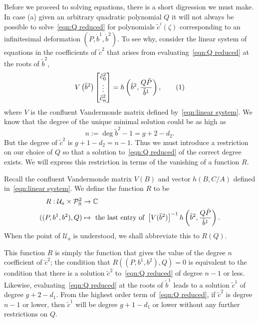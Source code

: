 \documentclass{article}
\begin{document}
Before we proceed to solving equations, there is a short digression we must make. In case (a) given an arbitrary quadratic polynomial $Q$ it will not always be possible to solve~\eqref{eqn:Q reduced} for polynomials $\tilde{c}^i(\zeta)$ corresponding to an infinitesimal deformation $(\dot{P},\dot{b}^1,\dot{b}^2)$. To see why, consider the linear system of equations in the coefficients of $\tilde{c}^2$ that arises from evaluating~\eqref{eqn:Q reduced} at the roots of $\tilde{b}^2$,
\[
V\left(\tilde{b}^2\right)
\begin{bmatrix}
\tilde{c}^2_0 \\ \vdots \\ \tilde{c}^2_n
\end{bmatrix}
=
h\bra{\tilde{b}^2, \frac{Q\tilde{P}}{\tilde{b}^1} },
\labelthis{eqn:Q reduced linear}
\]
where $V$ is the confluent Vandermonde matrix defined by~\eqref{eqn:linear system}. 
We know that the degree of the unique minimal solution could be as high as
\[
n := \deg \tilde{b}^2 - 1 = g + 2 - d_2.
\]
But 
the degree of $\tilde{c}^2$ is $g + 1 - d_2 = n-1$. 
Thus we must introduce a restriction on our choice of $Q$ so that a solution to~\eqref{eqn:Q reduced} of the correct degree exists. We will express this restriction in terms of the vanishing of a function $R$.

\begin{defn}\label{def:def R}
Recall the confluent Vandermonde matrix $V(B)$ and vector $h(B,C/A)$ defined in~\eqref{eqn:linear system}. We define the function $R$ to be
\begin{align*}
R : \mathcal{U}_{a} \times \mathcal{P}^2_{\mathbb{R}} &\to \mathbb{C} \\
((P,b^1,b^2), Q) &\mapsto \text{ the last entry of } \left[V( \tilde{b}^2 )\right]^{-1}
h\left(\tilde{b}^2, \frac{Q\tilde{P}}{\tilde{b}^1} \right).
\end{align*}
When the point of $\mathcal{U}_{a}$ is understood, we shall abbreviate this to $R(Q)$.
\end{defn}

This function $R$ is simply the function that gives the value of the degree $n$ coefficient of $\tilde{c}^2$; the condition that $R((P,b^1,b^2),Q) = 0$ is equivalent to the condition that there is a solution $\tilde{c}^2$ to~\eqref{eqn:Q reduced} of degree $n-1$ or less.
Likewise, evaluating~\eqref{eqn:Q reduced} at the roots of $\tilde{b}^1$ leads to a solution $\tilde{c}^1$ of degree $g+2 - d_1$. From the highest order term of~\eqref{eqn:Q reduced}, if $\tilde{c}^2$ is degree $n-1$ or lower, then $\tilde{c}^1$ will be degree $g + 1 - d_1$ or lower without any further restrictions on $Q$.
\end{document}
